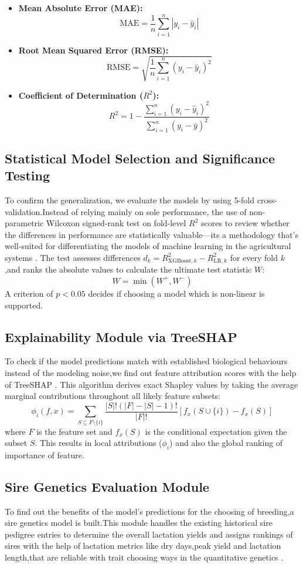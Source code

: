 \documentclass[conference]{IEEEtran}
\begin{document}
		\begin{itemize}
			\item \textbf{Mean Absolute Error (MAE):}
			$$\text{MAE} = \frac{1}{n} \sum_{i=1}^{n} |y_i - \hat{y}_i|$$
			\item \textbf{Root Mean Squared Error (RMSE):}
			$$\text{RMSE} = \sqrt{\frac{1}{n} \sum_{i=1}^{n} (y_i - \hat{y}_i)^2}$$
			\item \textbf{Coefficient of Determination ($R^2$):}
			$$R^2 = 1 - \frac{\sum_{i=1}^{n} (y_i - \hat{y}_i)^2}{\sum_{i=1}^{n} (y_i - \bar{y})^2}$$
		\end{itemize}
		
		\subsection{Statistical Model Selection and Significance Testing}
		To confirm the generalization, we evaluate the models by using 5-fold cross-validation.Instead of relying mainly on sole performance, the use of non-parametric Wilcoxon signed-rank test on fold-level $R^2$ scores to review whether the differences in performance are statistically valuable—its a methodology that's well-suited for differentiating the models of machine learning in the agricultural systems \cite{ref8, ref9}. The test assesses differences $d_k = R^2_{\text{XGBoost}, k} - R^2_{\text{LR}, k}$ for every fold $k$,and ranks the absolute values to calculate the ultimate test statistic $W$:
		$$W = \min(W^+, W^-)$$
		A criterion of $p < 0.05$ decides if choosing a  model which is non-linear is supported.
		
		\subsection{Explainability Module via TreeSHAP}
		To check if the model predictions match with established biological behaviours instead of the modeling noise,we find out feature attribution scores with the help of TreeSHAP \cite{ref4, ref20}. This algorithm derives exact Shapley values by taking the average marginal contributions throughout all likely feature subsets:
		$$\phi_i(f, x) = \sum_{S \subseteq F \setminus \{i\}} \frac{|S|!(|F| - |S| - 1)!}{|F|!} \left[f_x(S \cup \{i\}) - f_x(S)\right]$$
		where $F$ is the feature set and $f_x(S)$ is the conditional expectation given the subset $S$. This results in local attributions ($\phi_i$) and also the global ranking of importance of feature.
		
		\subsection{Sire Genetics Evaluation Module}
		To find out the benefits of the model's predictions for the choosing of breeding,a sire genetics model is built.This module handles the existing historical sire pedigree entries to determine the overall lactation yields and assigns rankings of sires with the help of lactation metrics like dry days,peak yield and lactation length,that are reliable with trait choosing ways in the quantitative genetics \cite{ref10}.
		
\end{document}
